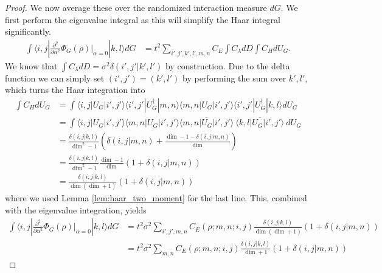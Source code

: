\documentclass{article}
\newcommand{\ket}[1]{|#1\rangle}
\newcommand{\bra}[1]{\langle #1|}
\newcommand{\parens}[1]{\left( #1 \right)}
\begin{document}
\begin{proof}
We now average these over the randomized interaction measure $dG$. We first perform the eigenvalue integral as this will simplify the Haar integral significantly. 
\begin{align}
    \int \bra{i,j} \frac{\partial^2}{\partial \alpha^2} \Phi_G(\rho) \bigg|_{\alpha = 0} \ket{k,l} dG &= t^2 \sum_{i',j',k',l',m,n} C_E \int C_{\lambda} dD \int C_{H} dU_G.
\end{align}
We know that $\int C_{\lambda} dD = \sigma^2 \delta(i',j' | k',l')$ by construction. Due to the delta function we can simply set $(i',j') = (k',l')$ by performing the sum over $k',l'$, which turns the Haar integration into
\begin{align}
    \int C_{H} dU_G &= \int \bra{i,j} U_G \ket{i',j'} \bra{i',j'} U_G^\dagger \ket{m,n} \bra{m,n} U_G \ket{i',j'} \bra{i',j'} U_G^\dagger \ket{k,l} dU_G \\
    &= \int \bra{i,j} U_G \ket{i',j'}  \bra{m,n} U_G \ket{i',j'} \overline{\bra{m,n} U_G \ket{i',j'}} ~ \overline{ \bra{k,l} U_G \ket{i',j'} }~ dU_G \\
    &= \frac{\delta(i,j | k,l)}{\dim^2 - 1} \parens{\delta(i,j | m,n) + \frac{\dim - 1 - \delta(i,j | m,n)}{\dim}} \\
    &= \frac{\delta(i,j | k,l)}{\dim^2 - 1} \frac{\dim - 1}{\dim} \parens{1 + \delta(i,j | m,n)} \\
    &= \frac{\delta(i, j | k,l)}{\dim (\dim + 1)} (1 + \delta(i,j | m,n))
\end{align}
where we used Lemma \ref{lem:haar_two_moment} for the last line. This, combined with the eigenvalue integration, yields
\begin{align}
    \int \bra{i,j} \frac{\partial^2}{\partial \alpha^2} \Phi_G(\rho) \bigg|_{\alpha = 0} \ket{k,l} dG &= t^2 \sigma^2 \sum_{i',j',m,n} C_E(\rho; m,n; i,j) \frac{\delta(i, j | k,l)}{\dim (\dim + 1)} (1 + \delta(i,j | m,n)) \\
    &= t^2 \sigma^2 \sum_{m,n} C_E(\rho; m,n; i,j) \frac{\delta(i, j | k,l)}{\dim + 1
    } (1 + \delta(i,j | m,n))
\end{align}


\end{proof}
\end{document}

